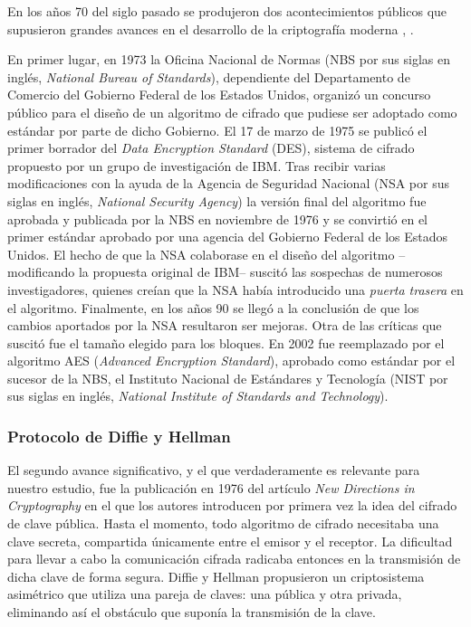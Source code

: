 \documentclass[
  a4paper,
  12pt,
  spanish,
]{scrartcl}
\begin{document}


En los años 70 del siglo pasado se produjeron dos acontecimientos públicos que supusieron grandes avances en el desarrollo de la criptografía moderna \parencite{singh_code_2003}, \parencite{thawte_history_2013}.

En primer lugar, en 1973 la Oficina Nacional de Normas (NBS por sus siglas en inglés, \textit{National Bureau of Standards}), dependiente del Departamento de Comercio del Gobierno Federal de los Estados Unidos, organizó un concurso público para el diseño de un algoritmo de cifrado que pudiese ser adoptado como estándar por parte de dicho Gobierno. 
El 17 de marzo de 1975 se publicó el primer borrador del \textit{Data Encryption Standard} (DES), sistema de cifrado propuesto por un grupo de investigación de IBM.
Tras recibir varias modificaciones con la ayuda de la Agencia de Seguridad Nacional (NSA por sus siglas en inglés, \textit{National Security Agency}) la versión final del algoritmo fue aprobada y publicada por la NBS en noviembre de 1976 y se convirtió en el primer estándar aprobado por una agencia del Gobierno Federal de los Estados Unidos. 
El hecho de que la NSA colaborase en el diseño del algoritmo --modificando la propuesta original de IBM-- suscitó las sospechas de numerosos investigadores, quienes creían que la NSA había introducido una \textit{puerta trasera} en el algoritmo. 
Finalmente, en los años 90 se llegó a la conclusión de que los cambios aportados por la NSA resultaron ser mejoras. %
Otra de las críticas que suscitó fue el tamaño elegido para los bloques.
En 2002 fue reemplazado por el algoritmo AES (\textit{Advanced Encryption Standard}), aprobado como estándar por el sucesor de la NBS, el Instituto Nacional de Estándares y Tecnología (NIST por sus siglas en inglés, \textit{National Institute of Standards and Technology}).

\subsubsection{Protocolo de Diffie y Hellman}

El segundo avance significativo, y el que verdaderamente es relevante para nuestro estudio, fue la publicación en 1976 del artículo \textit{New Directions in Cryptography} \parencite{diffie_new_1976} en el que los autores introducen por primera vez la idea del cifrado de clave pública. 
Hasta el momento, todo algoritmo de cifrado necesitaba una clave secreta, compartida únicamente entre el emisor y el receptor. 
La dificultad para llevar a cabo la comunicación cifrada radicaba entonces en la transmisión de dicha clave de forma segura. 
Diffie y Hellman propusieron un criptosistema asimétrico que utiliza una pareja de claves: una pública y otra privada, eliminando así el obstáculo que suponía la transmisión de la clave.
\end{document}
